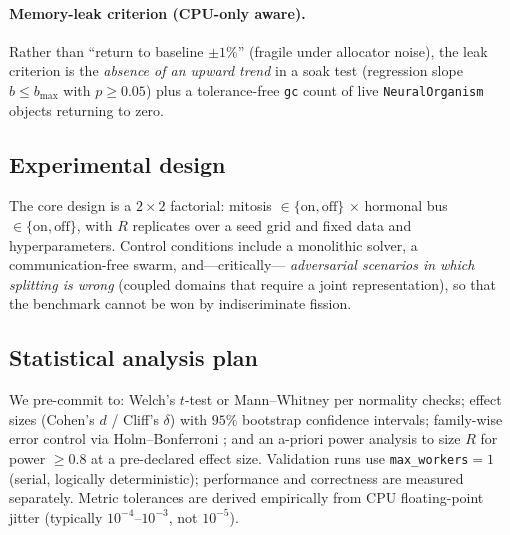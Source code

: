 \documentclass[11pt]{article}
\begin{document}
\paragraph{Memory-leak criterion (CPU-only aware).}
Rather than ``return to baseline $\pm1\%$'' (fragile under allocator noise), the
leak criterion is the \emph{absence of an upward trend} in a soak test
(regression slope $b\le b_{\max}$ with $p\ge0.05$) plus a tolerance-free
\texttt{gc} count of live \texttt{NeuralOrganism} objects returning to zero.

\subsection{Experimental design}
The core design is a $2\times2$ factorial: mitosis $\in\{\text{on},\text{off}\}$
$\times$ hormonal bus $\in\{\text{on},\text{off}\}$, with $R$ replicates over a
seed grid and fixed data and hyperparameters. Control conditions include a
monolithic solver, a communication-free swarm, and---critically---%
\emph{adversarial scenarios in which splitting is wrong} (coupled domains that
require a joint representation), so that the benchmark cannot be won by
indiscriminate fission.

\subsection{Statistical analysis plan}
We pre-commit to: Welch's $t$-test or Mann--Whitney per normality checks; effect
sizes (Cohen's $d$ / Cliff's $\delta$) with $95\%$ bootstrap confidence
intervals; family-wise error control via Holm--Bonferroni
\cite{holm1979bonferroni}; and an a-priori power analysis to size $R$ for
power $\ge0.8$ at a pre-declared effect size. Validation runs use
\texttt{max\_workers}$=1$ (serial, logically deterministic); performance and
correctness are measured separately. Metric tolerances are derived empirically
from CPU floating-point jitter (typically $10^{-4}$--$10^{-3}$, not $10^{-5}$).
\end{document}
